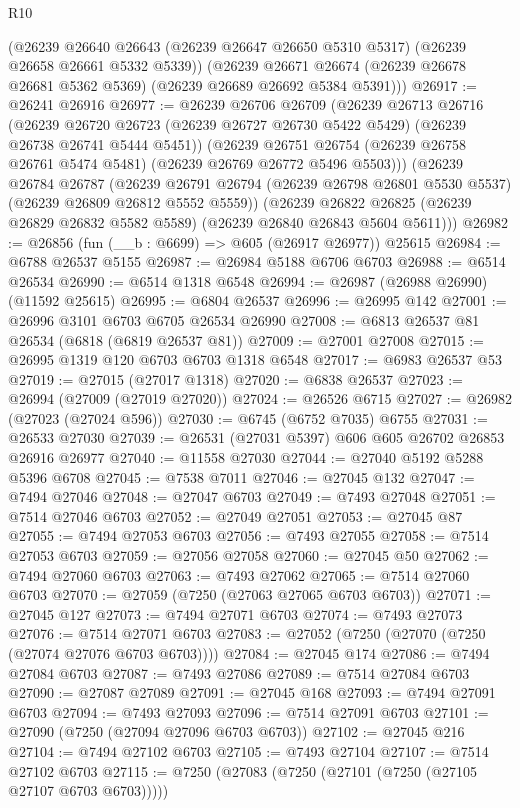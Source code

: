 \begin{lexlean}{R10}
\begin{coremodule}
      (@26239 @26640 @26643 (@26239 @26647 @26650 @5310 @5317) (@26239 @26658 @26661 @5332 @5339))
      (@26239 @26671 @26674 (@26239 @26678 @26681 @5362 @5369) (@26239 @26689 @26692 @5384 @5391)))
@26917 := @26241 @26916
@26977 := @26239
    @26706
    @26709
    (@26239
      @26713
      @26716
      (@26239 @26720 @26723 (@26239 @26727 @26730 @5422 @5429) (@26239 @26738 @26741 @5444 @5451))
      (@26239 @26751 @26754 (@26239 @26758 @26761 @5474 @5481) (@26239 @26769 @26772 @5496 @5503)))
    (@26239
      @26784
      @26787
      (@26239 @26791 @26794 (@26239 @26798 @26801 @5530 @5537) (@26239 @26809 @26812 @5552 @5559))
      (@26239 @26822 @26825 (@26239 @26829 @26832 @5582 @5589) (@26239 @26840 @26843 @5604 @5611)))
@26982 := @26856 (fun (__b : @6699) => @605 (@26917 @26977)) @25615
@26984 := @6788 @26537 @5155
@26987 := @26984 @5188 @6706 @6703
@26988 := @6514 @26534
@26990 := @6514 @1318 @6548
@26994 := @26987 (@26988 @26990) (@11592 @25615)
@26995 := @6804 @26537
@26996 := @26995 @142
@27001 := @26996 @3101 @6703 @6705 @26534 @26990
@27008 := @6813 @26537 @81 @26534 (@6818 (@6819 @26537 @81))
@27009 := @27001 @27008
@27015 := @26995 @1319 @120 @6703 @6703 @1318 @6548
@27017 := @6983 @26537 @53
@27019 := @27015 (@27017 @1318)
@27020 := @6838 @26537
@27023 := @26994 (@27009 (@27019 @27020))
@27024 := @26526 @6715
@27027 := @26982 (@27023 (@27024 @596))
@27030 := @6745 (@6752 @7035) @6755
@27031 := @26533 @27030
@27039 := @26531 (@27031 @5397) @606 @605 @26702 @26853 @26916 @26977
@27040 := @11558 @27030
@27044 := @27040 @5192 @5288 @5396 @6708
@27045 := @7538 @7011
@27046 := @27045 @132
@27047 := @7494 @27046
@27048 := @27047 @6703
@27049 := @7493 @27048
@27051 := @7514 @27046 @6703
@27052 := @27049 @27051
@27053 := @27045 @87
@27055 := @7494 @27053 @6703
@27056 := @7493 @27055
@27058 := @7514 @27053 @6703
@27059 := @27056 @27058
@27060 := @27045 @50
@27062 := @7494 @27060 @6703
@27063 := @7493 @27062
@27065 := @7514 @27060 @6703
@27070 := @27059 (@7250 (@27063 @27065 @6703 @6703))
@27071 := @27045 @127
@27073 := @7494 @27071 @6703
@27074 := @7493 @27073
@27076 := @7514 @27071 @6703
@27083 := @27052 (@7250 (@27070 (@7250 (@27074 @27076 @6703 @6703))))
@27084 := @27045 @174
@27086 := @7494 @27084 @6703
@27087 := @7493 @27086
@27089 := @7514 @27084 @6703
@27090 := @27087 @27089
@27091 := @27045 @168
@27093 := @7494 @27091 @6703
@27094 := @7493 @27093
@27096 := @7514 @27091 @6703
@27101 := @27090 (@7250 (@27094 @27096 @6703 @6703))
@27102 := @27045 @216
@27104 := @7494 @27102 @6703
@27105 := @7493 @27104
@27107 := @7514 @27102 @6703
@27115 := @7250 (@27083 (@7250 (@27101 (@7250 (@27105 @27107 @6703 @6703)))))

\end{coremodule}
\end{lexlean}
